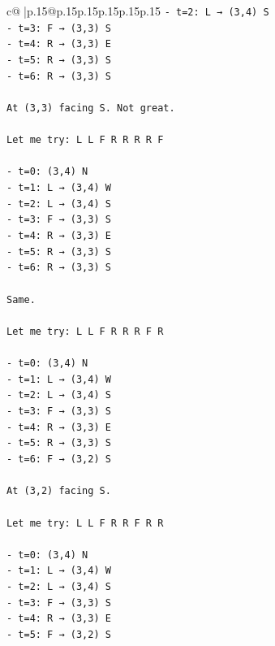 \documentclass{article}
\begin{document}
{\begin{supertabular}{c@{$\;$}|p{.15\linewidth}@{}p{.15\linewidth}p{.15\linewidth}p{.15\linewidth}p{.15\linewidth}p{.15\linewidth}}
{{{\texttt{{-} t=2: L → (3,4) S} \\
\texttt{{-} t=3: F → (3,3) S} \\
\texttt{{-} t=4: R → (3,3) E} \\
\texttt{{-} t=5: R → (3,3) S} \\
\texttt{{-} t=6: R → (3,3) S} \\
\\ 
\texttt{At (3,3) facing S. Not great.} \\
\\ 
\texttt{Let me try: L L F R R R R F} \\
\\ 
\texttt{{-} t=0: (3,4) N} \\
\texttt{{-} t=1: L → (3,4) W} \\
\texttt{{-} t=2: L → (3,4) S} \\
\texttt{{-} t=3: F → (3,3) S} \\
\texttt{{-} t=4: R → (3,3) E} \\
\texttt{{-} t=5: R → (3,3) S} \\
\texttt{{-} t=6: R → (3,3) S} \\
\\ 
\texttt{Same.} \\
\\ 
\texttt{Let me try: L L F R R R F R} \\
\\ 
\texttt{{-} t=0: (3,4) N} \\
\texttt{{-} t=1: L → (3,4) W} \\
\texttt{{-} t=2: L → (3,4) S} \\
\texttt{{-} t=3: F → (3,3) S} \\
\texttt{{-} t=4: R → (3,3) E} \\
\texttt{{-} t=5: R → (3,3) S} \\
\texttt{{-} t=6: F → (3,2) S} \\
\\ 
\texttt{At (3,2) facing S.} \\
\\ 
\texttt{Let me try: L L F R R F R R} \\
\\ 
\texttt{{-} t=0: (3,4) N} \\
\texttt{{-} t=1: L → (3,4) W} \\
\texttt{{-} t=2: L → (3,4) S} \\
\texttt{{-} t=3: F → (3,3) S} \\
\texttt{{-} t=4: R → (3,3) E} \\
\texttt{{-} t=5: F → (3,2) S} \\
}}}
\end{supertabular}}
\end{document}
